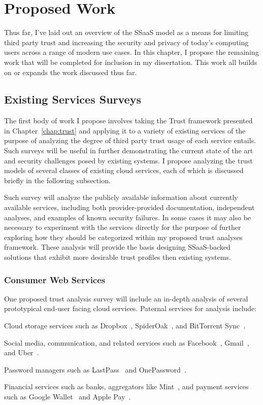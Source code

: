 \chapter{Proposed Work}
\label{chap:planned}

Thus far, I've laid out an overview of the SSaaS model as a means for
limiting third party trust and increasing the security and privacy of
today's computing users across a range of modern use cases. In this
chapter, I propose the remaining work that will be completed for
inclusion in my dissertation. This work all builds on or expands the
work discussed thus far.

\section{Existing Services Surveys}
\label{chap:planned:survey}

The first body of work I propose involves taking the Trust framework
presented in Chapter~\ref{chap:trust} and applying it to a variety of
existing services of the purpose of analyzing the degree of third
party trust usage of each service entails. Such surveys will be
useful in further demonstrating the current state of the art and
security challenges posed by existing systems. I propose analyzing the
trust models of several classes of existing cloud services, each of
which is discussed briefly in the following subsection.

Such survey will analyze the publicly available information about
currently available services, including both provider-provided
documentation, independent analyses, and examples of known security
failures. In some cases it may also be necessary to experiment with the
services directly for the purpose of further exploring how they should
be categorized within my proposed trust analyses framework. These
analysis will provide the basis designing SSaaS-backed solutions that
exhibit more desirable trust profiles then existing systems.

\subsection{Consumer Web Services}

One proposed trust analysis survey will include an in-depth analysis of
several prototypical end-user facing cloud services. Paternal services
for analysis include:

\begin{packed_item}
\item Cloud storage services such as Dropbox~\cite{dropbox},
  SpiderOak~\cite{spideroak}, and BitTorrent
  Sync~\cite{bittorrent-sync}.
\item Social media, communication, and related services such as
  Facebook~\cite{facebook}, Gmail~\cite{google-gmail}, and
  Uber~\cite{uber}.
\item Password managers such as LastPass~\cite{lastpass} and
  OnePassword~\cite{onepassword}.
\item Financial services such as banks, aggregators like
  Mint~\cite{mint}, and payment services such as Google
  Wallet~\cite{google-wallet} and Apple Pay~\cite{apple-pay}.
\end{packed_item}

